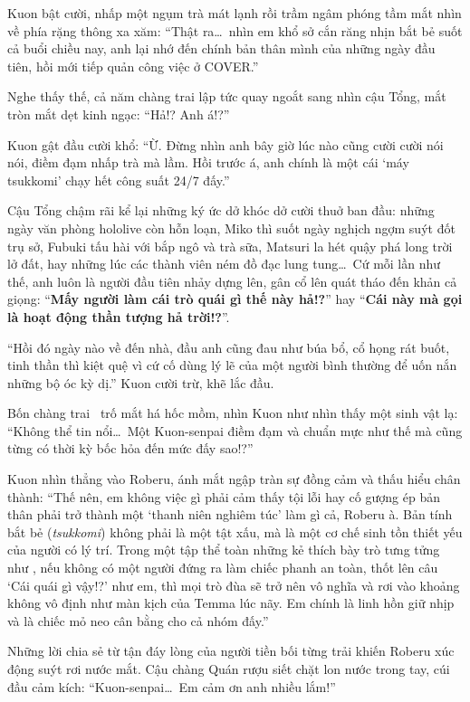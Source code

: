 \documentclass[../main.tex]{subfiles}
\begin{document}
Kuon bật cười, nhấp một ngụm trà mát lạnh rồi trầm ngâm phóng tầm mắt nhìn về phía rặng thông xa xăm: ``Thật ra\dots\ nhìn em khổ sở cắn răng nhịn bắt bẻ suốt cả buổi chiều nay, anh lại nhớ đến chính bản thân mình của những ngày đầu tiên, hồi mới tiếp quản công việc ở COVER.''

Nghe thấy thế, cả năm chàng trai lập tức quay ngoắt sang nhìn cậu Tổng, mắt tròn mắt dẹt kinh ngạc: ``Hả!? Anh á!?''

Kuon gật đầu cười khổ: ``Ừ. Đừng nhìn anh bây giờ lúc nào cũng cười cười nói nói, điềm đạm nhấp trà mà lầm. Hồi trước á, anh chính là một cái `máy tsukkomi' chạy hết công suất 24/7 đấy.''

Cậu Tổng chậm rãi kể lại những ký ức dở khóc dở cười thuở ban đầu: những ngày văn phòng hololive còn hỗn loạn, Miko thì suốt ngày nghịch ngợm suýt đốt trụ sở, Fubuki tấu hài với bắp ngô và trà sữa, Matsuri la hét quậy phá long trời lở đất, hay những lúc các thành viên ném đồ đạc lung tung\dots\ Cứ mỗi lần như thế, anh luôn là người đầu tiên nhảy dựng lên, gân cổ lên quát tháo đến khản cả giọng: ``\textbf{Mấy người làm cái trò quái gì thế này hả!?}'' hay ``\textbf{Cái này mà gọi là hoạt động thần tượng hả trời!?}''.

``Hồi đó ngày nào về đến nhà, đầu anh cũng đau như búa bổ, cổ họng rát buốt, tinh thần thì kiệt quệ vì cứ cố dùng lý lẽ của một người bình thường để uốn nắn những bộ óc kỳ dị.'' Kuon cười trừ, khẽ lắc đầu.

Bốn chàng trai \hls\ trố mắt há hốc mồm, nhìn Kuon như nhìn thấy một sinh vật lạ: ``Không thể tin nổi\dots\ Một Kuon-senpai điềm đạm và chuẩn mực như thế mà cũng từng có thời kỳ bốc hỏa đến mức đấy sao!?''

Kuon nhìn thẳng vào Roberu, ánh mắt ngập tràn sự đồng cảm và thấu hiểu chân thành:  ``Thế nên, em không việc gì phải cảm thấy tội lỗi hay cố gượng ép bản thân phải trở thành một `thanh niên nghiêm túc' làm gì cả, Roberu à. Bản tính bắt bẻ (\textit{tsukkomi}) không phải là một tật xấu, mà là một cơ chế sinh tồn thiết yếu của người có lý trí. Trong một tập thể toàn những kẻ thích bày trò tưng tửng như \hls, nếu không có một người đứng ra làm chiếc phanh an toàn, thốt lên câu `Cái quái gì vậy!?' như em, thì mọi trò đùa sẽ trở nên vô nghĩa và rơi vào khoảng không vô định như màn kịch của Temma lúc nãy. Em chính là linh hồn giữ nhịp và là chiếc mỏ neo cân bằng cho cả nhóm đấy.''

Những lời chia sẻ từ tận đáy lòng của người tiền bối từng trải khiến Roberu xúc động suýt rơi nước mắt. Cậu chàng Quán rượu siết chặt lon nước trong tay, cúi đầu cảm kích: ``Kuon-senpai\dots\ Em cảm ơn anh nhiều lắm!''
\end{document}
